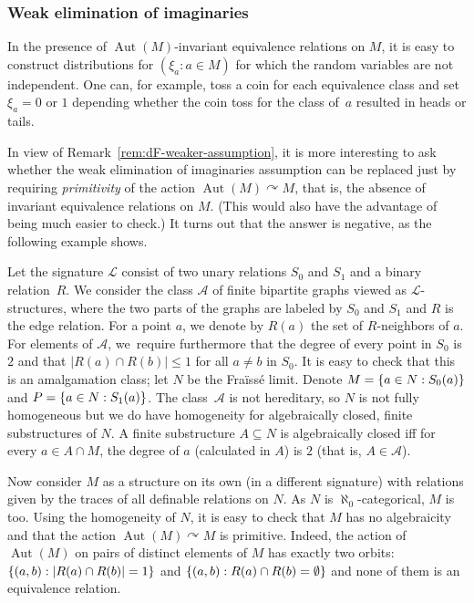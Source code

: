 \documentclass[JEP,XML,SOM,Unicode,published]{cedram}
\let\mathcal\mathscr
\let\actson\curvearrowright
\let\sub\subseteq
\theoremstyle{plain}
\theoremstyle{definition}
\newcommand{\cA}{\mathcal{A}}
\newcommand{\cL}{\mathcal{L}}
\DeclareMathOperator{\Aut}{Aut}
\DeclarePairedDelimiter\set{\{}{\}}
\begin{document}
\subsubsection{Weak elimination of imaginaries} In the presence of $\Aut(M)$-invariant equivalence relations on $M$, it is easy to construct distributions for $(\xi_a : a \in M)$ for which the random variables are not independent. One can, for example, toss a coin for each equivalence class and set $\xi_a = 0$ or $1$ depending whether the coin toss for the class of~$a$ resulted in heads or tails.

In view of Remark~\ref{rem:dF-weaker-assumption}, it is more interesting to ask whether the weak elimination of imaginaries assumption can be replaced just by requiring \emph{primitivity} of the action $\Aut(M) \actson M$, that is, the absence of invariant equivalence relations on $M$. (This would also have the advantage of being much easier to check.) It turns out that the answer is negative, as the following example shows.

Let the signature $\cL$ consist of two unary relations $S_0$ and $S_1$ and a binary relation~$R$. We consider the class $\cA$ of finite bipartite graphs viewed as $\cL$-structures, where the two parts of the graphs are labeled by $S_0$ and $S_1$ and $R$ is the edge relation. For a point $a$, we denote by $R(a)$ the set of $R$-neighbors of $a$. For elements of $\cA$, we~require furthermore that the degree of every point in $S_0$ is $2$ and that $|R(a) \cap R(b)| \leq 1$ for all $a \neq b$ in $S_0$. It is easy to check that this is an amalgamation class; let $N$ be the Fraïssé limit. Denote $M = \set{a \in N : S_0(a)}$ and $P = \set{a \in N : S_1(a)}$. The class~$\cA$ is not hereditary, so $N$ is not fully homogeneous but we do have homogeneity for algebraically closed, finite substructures of $N$. A finite substructure $A \sub N$ is algebraically closed iff for every $a \in A \cap M$, the degree of $a$ (calculated in $A$) is $2$ (that is, $A \in \cA$).

Now consider $M$ as a structure on its own (in a different signature) with relations given by the traces of all definable relations on $N$. As $N$ is $\aleph_0$-categorical, $M$ is too. Using the homogeneity of $N$, it is easy to check that $M$ has no algebraicity and that the action $\Aut(M) \actson M$ is primitive. Indeed, the action of $\Aut(M)$ on pairs of distinct elements of $M$ has exactly two orbits: $\set{(a, b) : |R(a) \cap R(b)| = 1}$ and $\set{(a, b) : R(a) \cap R(b) = \emptyset}$ and none of them is an equivalence relation.
\end{document}
